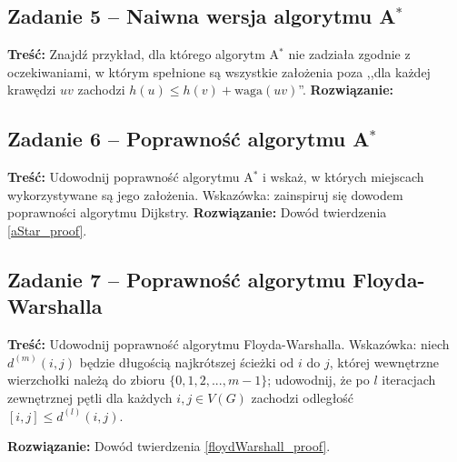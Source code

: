 \subsection{Zadanie 5 -- Naiwna wersja algorytmu A\texorpdfstring{$^*$}{TEXT}}
\textbf{Treść: } Znajdź przykład, dla 
którego algorytm A$^*$ nie zadziała zgodnie z oczekiwaniami, 
w którym spełnione
są wszystkie założenia 
poza 
,,dla każdej krawędzi $uv$ zachodzi $h(u) \leq h(v) + \text{waga}(uv)$''.
\textbf{Rozwiązanie: }

\subsection{Zadanie 6 -- Poprawność algorytmu A\texorpdfstring{$^*$}{TEXT}}
\textbf{Treść: } Udowodnij poprawność algorytmu 
A$^*$ i wskaż, w których miejscach wykorzystywane są jego założenia.
Wskazówka: zainspiruj się dowodem poprawności algorytmu Dijkstry.
\textbf{Rozwiązanie: } Dowód twierdzenia \ref{aStar_proof}.

\subsection{Zadanie 7 -- Poprawność algorytmu Floyda-Warshalla}
\textbf{Treść:} Udowodnij poprawność algorytmu Floyda-Warshalla. 
Wskazówka: niech 
$d^{(m)}(i, j)$ będzie długością
najkrótszej ścieżki od $i$ do $j$, której wewnętrzne wierzchołki należą
do zbioru $\{0, 1, 2, . . . , m - 1\}$; 
udowodnij, że po $l$
iteracjach zewnętrznej pętli dla każdych $i, j \in V (G)$ zachodzi 
odległość$[i, j] \leq d^{(l)}(i, j)$.

\textbf{Rozwiązanie:} Dowód twierdzenia \ref{floydWarshall_proof}.
